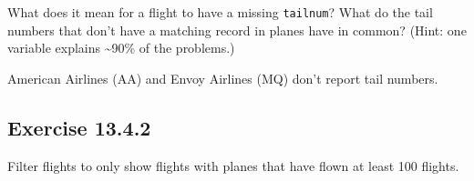 \documentclass[]{book}
\newenvironment{Shaded}{\begin{snugshade}}{\end{snugshade}}
\newcommand{\CommentTok}[1]{\textcolor[rgb]{0.56,0.35,0.01}{\textit{#1}}}
\newcommand{\DataTypeTok}[1]{\textcolor[rgb]{0.13,0.29,0.53}{#1}}
\newcommand{\KeywordTok}[1]{\textcolor[rgb]{0.13,0.29,0.53}{\textbf{#1}}}
\newcommand{\NormalTok}[1]{#1}
\newcommand{\OperatorTok}[1]{\textcolor[rgb]{0.81,0.36,0.00}{\textbf{#1}}}
\newcommand{\OtherTok}[1]{\textcolor[rgb]{0.56,0.35,0.01}{#1}}
\newcommand{\StringTok}[1]{\textcolor[rgb]{0.31,0.60,0.02}{#1}}
\theoremstyle{plain}
\theoremstyle{remark}
\theoremstyle{definition}
\theoremstyle{definition}
\theoremstyle{definition}
\theoremstyle{remark}
\begin{document}
What does it mean for a flight to have a missing \texttt{tailnum}? What
do the tail numbers that don't have a matching record in planes have in
common? (Hint: one variable explains \textasciitilde{}90\% of the
problems.)

American Airlines (AA) and Envoy Airlines (MQ) don't report tail
numbers.

\begin{Shaded}
\end{Shaded}

\hypertarget{exercise-13.4.2}{%
\subsection*{\texorpdfstring{Exercise
{13.4.2}}{Exercise 13.4.2}}\label{exercise-13.4.2}}

Filter flights to only show flights with planes that have flown at least
100 flights.
\end{document}
